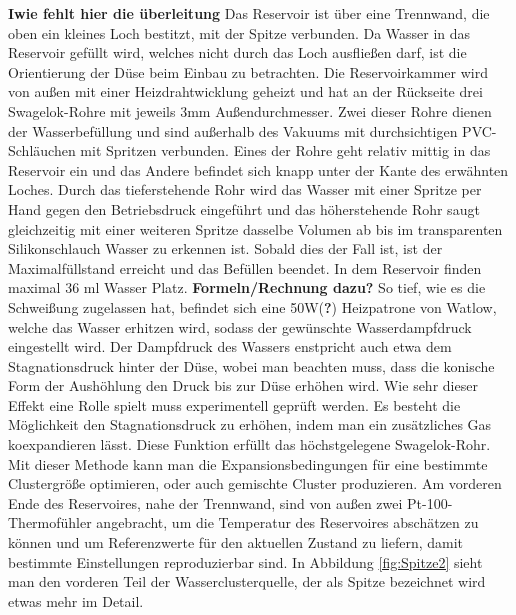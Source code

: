 \textbf{Iwie fehlt hier die überleitung} Das Reservoir ist über eine Trennwand, die oben ein kleines Loch bestitzt, mit der Spitze verbunden. Da Wasser in das Reservoir gefüllt wird, welches nicht durch das Loch ausfließen darf, ist die Orientierung der Düse beim Einbau zu betrachten. Die Reservoirkammer wird von außen mit einer Heizdrahtwicklung geheizt und hat an der Rückseite drei Swagelok-Rohre mit jeweils 3mm Außendurchmesser. Zwei dieser Rohre dienen der Wasserbefüllung und sind außerhalb des Vakuums mit durchsichtigen PVC-Schläuchen mit Spritzen verbunden. Eines der Rohre geht relativ mittig in das Reservoir ein und das Andere befindet sich knapp unter der Kante des erwähnten Loches. Durch das tieferstehende Rohr wird das Wasser mit einer Spritze per Hand gegen den Betriebsdruck eingeführt und das höherstehende Rohr saugt gleichzeitig mit einer weiteren Spritze dasselbe Volumen ab bis im transparenten Silikonschlauch Wasser zu erkennen ist. Sobald dies der Fall ist, ist der Maximalfüllstand erreicht und das Befüllen beendet. In dem Reservoir finden maximal 36 ml Wasser Platz. \textbf{Formeln/Rechnung dazu?} So tief, wie es die Schweißung zugelassen hat, befindet sich eine 50W(\textbf{?}) Heizpatrone von Watlow, welche das Wasser erhitzen wird, sodass der gewünschte Wasserdampfdruck eingestellt wird. Der Dampfdruck des Wassers enstpricht auch etwa dem Stagnationsdruck hinter der Düse, wobei man beachten muss, dass die konische Form der Aushöhlung den Druck bis zur Düse erhöhen wird. Wie sehr dieser Effekt eine Rolle spielt muss experimentell geprüft werden. Es besteht die Möglichkeit den Stagnationsdruck zu erhöhen, indem man ein zusätzliches Gas koexpandieren lässt. Diese Funktion erfüllt das höchstgelegene Swagelok-Rohr. Mit dieser Methode kann man die Expansionsbedingungen für eine bestimmte Clustergröße optimieren, oder auch gemischte Cluster produzieren. Am vorderen Ende des Reservoires, nahe der Trennwand, sind von außen zwei Pt-100-Thermofühler angebracht, um die Temperatur des Reservoires abschätzen zu können und um Referenzwerte für den aktuellen Zustand zu liefern, damit bestimmte Einstellungen reproduzierbar sind. 
In Abbildung \ref{fig:Spitze2} sieht man den vorderen Teil der Wasserclusterquelle, der als Spitze bezeichnet wird etwas mehr im Detail.
